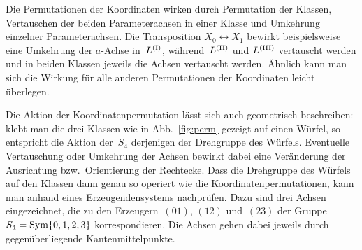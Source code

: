 Die Permutationen der Koordinaten wirken durch Permutation der Klassen, Vertauschen der beiden Parameterachsen in einer Klasse und Umkehrung einzelner Parameterachsen. Die Transposition $X_0 \leftrightarrow X_1$ bewirkt beispielsweise eine Umkehrung der $a$-Achse in~$\Lcl(I)$, während~$\Lcl(II)$ und $\Lcl(III)$ vertauscht werden und in beiden Klassen jeweils die Achsen vertauscht werden. Ähnlich kann man sich die Wirkung für alle anderen Permutationen der Koordinaten leicht überlegen.

Die Aktion der Koordinatenpermutation lässt sich auch geometrisch beschreiben: klebt man die drei Klassen wie in Abb.~\ref{fig:perm} gezeigt auf einen Würfel, so entspricht die Aktion der~$S_4$ derjenigen der Drehgruppe des Würfels. Eventuelle Vertauschung oder Umkehrung der Achsen bewirkt dabei eine Veränderung der Ausrichtung bzw.\ Orientierung der Recht\-ecke. Dass die Drehgruppe des Würfels auf den Klassen dann genau so operiert wie die Koordinatenpermutationen, kann man anhand eines Erzeugendensystems nachprüfen. Dazu sind drei Achsen eingezeichnet, die zu den Erzeugern~$(01)$, $(12)$ und~$(23)$ der Gruppe $S_4 = \operatorname{Sym} \{0,1,2,3\}$ korrespondieren. Die Achsen gehen dabei jeweils durch gegenüberliegende Kantenmittelpunkte.

